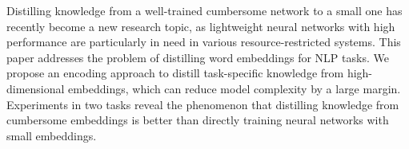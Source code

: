 Distilling knowledge from a well-trained cumbersome network to a small one has recently become a new research topic, as lightweight neural networks with high performance are particularly in need in various resource-restricted systems. This paper addresses the problem of distilling word embeddings for NLP tasks. We propose an encoding approach to distill task-specific knowledge from high-dimensional embeddings, which can reduce model complexity by a large margin. Experiments in two tasks reveal the phenomenon that distilling knowledge from cumbersome embeddings is better than directly training neural networks with small embeddings.
